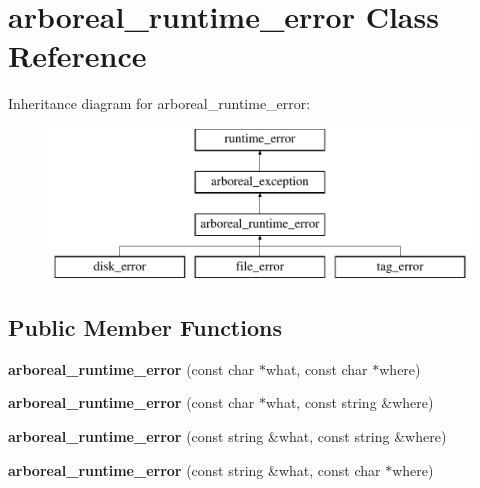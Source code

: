 \hypertarget{classarboreal__runtime__error}{}\section{arboreal\+\_\+runtime\+\_\+error Class Reference}
\label{classarboreal__runtime__error}
Inheritance diagram for arboreal\+\_\+runtime\+\_\+error\+:\begin{figure}[H]
\begin{center}
\leavevmode
\includegraphics[height=4.000000cm]{classarboreal__runtime__error}
\end{center}
\end{figure}
\subsection*{Public Member Functions}
\begin{DoxyCompactItemize}
\item 
\mbox{\label{classarboreal__runtime__error_a69069da7eded2f21d00624770dc3ac14}} 
{\bfseries arboreal\+\_\+runtime\+\_\+error} (const char $\ast$what, const char $\ast$where)
\item 
\mbox{\label{classarboreal__runtime__error_ae68030a683ca179df74b6dfba2b2531a}} 
{\bfseries arboreal\+\_\+runtime\+\_\+error} (const char $\ast$what, const string \&where)
\item 
\mbox{\label{classarboreal__runtime__error_a3749d32febd044daaf5093997a179023}} 
{\bfseries arboreal\+\_\+runtime\+\_\+error} (const string \&what, const string \&where)
\item 
\mbox{\label{classarboreal__runtime__error_a5f4e96e719ca8581749c8a819dbc091c}} 
{\bfseries arboreal\+\_\+runtime\+\_\+error} (const string \&what, const char $\ast$where)
\end{DoxyCompactItemize}
